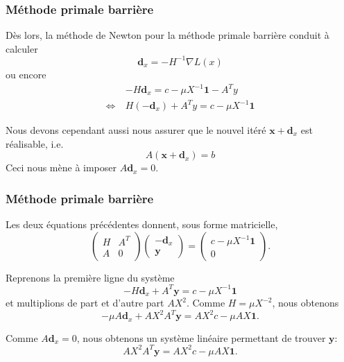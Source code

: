 \documentclass[usepdftitle=false, aspectratio=169]{beamer}
\def\bc{\boldsymbol{c}}
\def\bd{\boldsymbol{d}}
\def\bx{\boldsymbol{x}}
\def\by{\boldsymbol{y}}
\def\bA{\boldsymbol{A}}
\def\bX{\boldsymbol{X}}
\def\bzero{\boldsymbol{0}}
\def\bone{\boldsymbol{1}}
\begin{document}
\begin{frame}
\frametitle{Méthode primale barrière}

Dès lors, la méthode de Newton pour la méthode primale barrière conduit à calculer
$$
\bd_x = - H^{-1}\nabla L(x)
$$
ou encore
\begin{align*}
& -H\bd_x =  c-\mu X^{-1}\bone - A^Ty \\
\Leftrightarrow\  &  H(-\bd_x) + A^Ty =  c-\mu X^{-1}\bone
\end{align*}

\mbox{}

Nous devons cependant aussi nous assurer que le nouvel itéré $\bx + \bd_x$ est réalisable, i.e.
$$
A(\bx + \bd_x) =b
$$
Ceci nous mène à imposer $A\bd_x = 0$.

\end{frame}

\begin{frame}
\frametitle{Méthode primale barrière}

Les deux équations précédentes donnent, sous forme matricielle,
$$
\begin{pmatrix}
H & A^T \\
A & 0
\end{pmatrix}
\begin{pmatrix}
-\bd_x \\ \by
\end{pmatrix}
=
\begin{pmatrix}
c - \mu X^{-1}\bone \\ 0
\end{pmatrix}.
$$

\mbox{}

Reprenons la première ligne du système
$$
-H\bd_x + A^T\by = c - \mu X^{-1}\bone
$$
et multiplions de part et d'autre part $AX^2$. Comme $H = \mu X^{-2}$, nous obtenons
$$
-\mu A\bd_x + AX^2A^T\by = AX^2c - \mu AX \bone.
$$


Comme $A\bd_x = 0$, nous obtenons un système linéaire permettant de trouver $\by$:
$$
AX^2A^T\by = AX^2c - \mu AX \bone.
$$

\end{frame}
\end{document}
